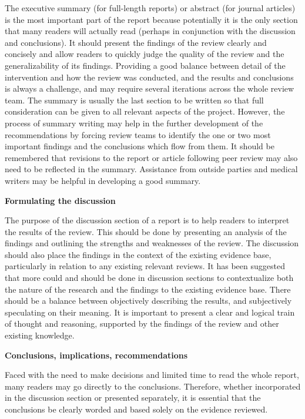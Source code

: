 \documentclass[
  10pt,
  a4paper,
  DIV=11,
  numbers=noendperiod]{scrreprt}
\begin{document}
The executive summary (for full-length reports) or abstract (for journal
articles) is the most important part of the report because potentially
it is the only section that many readers will actually read (perhaps in
conjunction with the discussion and conclusions). It should present the
findings of the review clearly and concisely and allow readers to
quickly judge the quality of the review and the generalizability of its
findings. Providing a good balance between detail of the intervention
and how the review was conducted, and the results and conclusions is
always a challenge, and may require several iterations across the whole
review team. The summary is usually the last section to be written so
that full consideration can be given to all relevant aspects of the
project. However, the process of summary writing may help in the further
development of the recommendations by forcing review teams to identify
the one or two most important findings and the conclusions which flow
from them. It should be remembered that revisions to the report or
article following peer review may also need to be reflected in the
summary. Assistance from outside parties and medical writers may be
helpful in developing a good summary.

\textbf{Formulating the discussion}

The purpose of the discussion section of a report is to help readers to
interpret the results of the review. This should be done by presenting
an analysis of the findings and outlining the strengths and weaknesses
of the review. The discussion should also place the findings in the
context of the existing evidence base, particularly in relation to any
existing relevant reviews. It has been suggested that more could and
should be done in discussion sections to contextualize both the nature
of the research and the findings to the existing evidence base. There
should be a balance between objectively describing the results, and
subjectively speculating on their meaning. It is important to present a
clear and logical train of thought and reasoning, supported by the
findings of the review and other existing knowledge.

\textbf{Conclusions, implications, recommendations}

Faced with the need to make decisions and limited time to read the whole
report, many readers may go directly to the conclusions. Therefore,
whether incorporated in the discussion section or presented separately,
it is essential that the conclusions be clearly worded and based solely
on the evidence reviewed.
\end{document}
